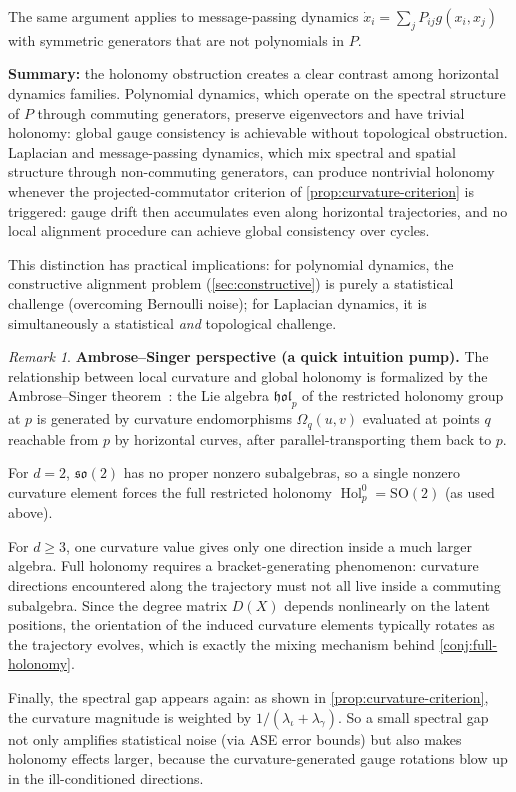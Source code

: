 \documentclass{article}
\newcommand{\so}{\mathfrak{so}}
\newcommand{\hol}{\mathfrak{hol}}
\DeclareMathOperator{\Hol}{Hol}
\theoremstyle{plain}
\theoremstyle{definition}
\theoremstyle{remark}
\newtheorem*{remark}{Remark}
\begin{document}
The same argument applies to message-passing dynamics $\dot{x}_i = \sum_j P_{ij} g(x_i, x_j)$ with symmetric generators that are not polynomials in $P$.

\textbf{Summary:} the holonomy obstruction creates a clear contrast among horizontal dynamics families.
Polynomial dynamics, which operate on the spectral structure of $P$ through commuting generators, preserve eigenvectors and have trivial holonomy: global gauge consistency is achievable without topological obstruction.
Laplacian and message-passing dynamics, which mix spectral and spatial structure through non-commuting generators, can produce nontrivial holonomy whenever the projected-commutator criterion of \cref{prop:curvature-criterion} is triggered: gauge drift then accumulates even along horizontal trajectories, and no local alignment procedure can achieve global consistency over cycles.

This distinction has practical implications: for polynomial dynamics, the constructive alignment problem (\cref{sec:constructive}) is purely a statistical challenge (overcoming Bernoulli noise); for Laplacian dynamics, it is simultaneously a statistical \emph{and} topological challenge.

\begin{remark}
\textbf{Ambrose--Singer perspective (a quick intuition pump).}
The relationship between local curvature and global holonomy is formalized by the Ambrose--Singer theorem~\citep{kobayashi1963foundations}: the Lie algebra $\hol_p$ of the restricted holonomy group at $p$ is generated by curvature endomorphisms $\Omega_q(u, v)$ evaluated at points $q$ reachable from $p$ by horizontal curves, after parallel-transporting them back to $p$.

For $d = 2$, $\so(2)$ has no proper nonzero subalgebras, so a single nonzero curvature element forces the full restricted holonomy $\Hol_p^0 = \mathrm{SO}(2)$ (as used above).

For $d \ge 3$, one curvature value gives only one direction inside a much larger algebra.
Full holonomy requires a bracket-generating phenomenon: curvature directions encountered along the trajectory must not all live inside a commuting subalgebra.
Since the degree matrix $D(X)$ depends nonlinearly on the latent positions, the orientation of the induced curvature elements typically rotates as the trajectory evolves, which is exactly the mixing mechanism behind \cref{conj:full-holonomy}.

Finally, the spectral gap appears again: as shown in \cref{prop:curvature-criterion}, the curvature magnitude is weighted by $1/(\lambda_\iota + \lambda_\gamma)$.
So a small spectral gap not only amplifies statistical noise (via ASE error bounds) but also makes holonomy effects larger, because the curvature-generated gauge rotations blow up in the ill-conditioned directions.
\end{remark}
\end{document}
